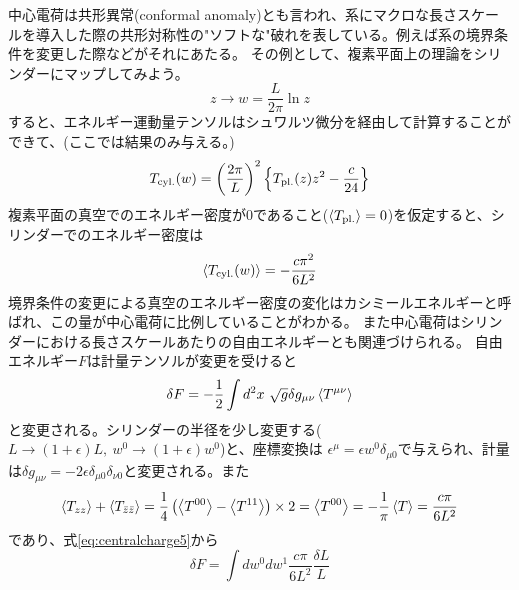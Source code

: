 \documentclass[11pt, aps, longbibliography]{article}
\numberwithin{equation}{section}
\begin{document}
        中心電荷は共形異常(conformal anomaly)とも言われ、系にマクロな長さスケールを導入した際の共形対称性の"ソフトな"破れを表している。例えば系の境界条件を変更した際などがそれにあたる。
        その例として、複素平面上の理論をシリンダーにマップしてみよう。
        \begin{equation}\label{eq:centralcharge2}
            z \rightarrow w = \frac{L}{2\pi} \ln z
        \end{equation}
        すると、エネルギー運動量テンソルはシュワルツ微分を経由して計算することができて、(ここでは結果のみ与える。)
        \begin{equation}\label{eq:centralcharge3}
            T_{\rm cyl.}(w) = \left( \frac{2\pi}{L} \right)^2 \left\{ T_{\rm pl.}(z)z^2 - \frac{c}{24} \right\}
        \end{equation}
        複素平面の真空でのエネルギー密度が0であること($\expval{T_{\rm pl.}}=0$)を仮定すると、シリンダーでのエネルギー密度は
        \begin{equation}\label{eq:centralcharge4}
            \expval{T_{\rm cyl.}(w)} = -\frac{c\pi^2}{6L^2}
        \end{equation}
        境界条件の変更による真空のエネルギー密度の変化はカシミールエネルギーと呼ばれ、この量が中心電荷に比例していることがわかる。
        また中心電荷はシリンダーにおける長さスケールあたりの自由エネルギーとも関連づけられる。
        自由エネルギー$F$は計量テンソルが変更を受けると
        \begin{equation}\label{eq:centralcharge5}
            \delta F = -\frac{1}{2}\int d^2x \ \sqrt{g}\delta g_{\mu\nu}\expval{T^{\mu\nu}}
        \end{equation}
        と変更される。シリンダーの半径を少し変更する($L\rightarrow (1+\epsilon)L, \ w^0 \rightarrow (1+\epsilon)w^0$)と、座標変換は
        $\epsilon^\mu = \epsilon w^0 \delta_{\mu 0}$で与えられ、計量は$\delta g_{\mu\nu}=-2\epsilon \delta_{\mu0}\delta_{\nu0}$と変更される。また
        \begin{equation}\label{eq:centralcharge6}
            \expval{T_{zz}} + \expval{T_{\bar{z}\bar{z}}} = \frac{1}{4}\left(\expval{T^{00}} - \expval{T^{11}}\right) \times 2 = \expval{T^{00}} = -\frac{1}{\pi}\expval{T} = \frac{c\pi}{6L^2}
        \end{equation}
        であり、式\eqref{eq:centralcharge5}から
        \begin{equation}\label{eq:centralcharge7}
            \delta F = \int dw^0 dw^1 \frac{c\pi}{6L^2} \frac{\delta L}{L}
        \end{equation}
\end{document}
